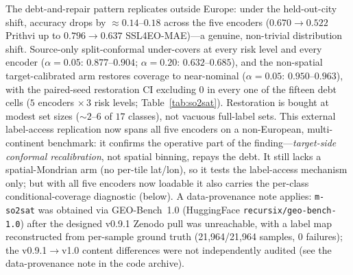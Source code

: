 \documentclass[journal]{IEEEtran}
\renewcommand{\_}{\textunderscore\allowbreak}
\begin{document}
The debt-and-repair pattern replicates outside Europe: under the held-out-city shift, accuracy
drops by ${\approx}0.14$--$0.18$ across the five encoders ($0.670\to0.522$ Prithvi up to $0.796\to0.637$
SSL4EO-MAE)---a genuine, non-trivial distribution shift.
Source-only split-conformal under-covers at every risk level and every encoder ($\alpha=0.05$: $0.877$--$0.904$;
$\alpha=0.20$: $0.632$--$0.685$), and the non-spatial target-calibrated arm restores coverage to
near-nominal ($\alpha=0.05$: $0.950$--$0.963$), with the paired-seed restoration CI
excluding $0$ in every one of the fifteen debt cells ($5$ encoders ${\times}\,3$ risk levels; Table~\ref{tab:so2sat}). Restoration is bought at modest set sizes
(${\sim}2$--$6$ of $17$ classes), not vacuous full-label sets. This external label-access
replication now spans all five encoders on a non-European, multi-continent benchmark: it confirms the operative part of the
finding---\emph{target-side conformal recalibration}, not spatial binning, repays the debt. It still lacks a
spatial-Mondrian arm (no per-tile lat/lon), so it tests the label-access mechanism only; but with all
five encoders now loadable it also carries the per-class conditional-coverage diagnostic (below). A data-provenance note applies: \texttt{m-so2sat} was
obtained via GEO-Bench~1.0 (HuggingFace \texttt{recursix/geo-bench-1.0}) after the designed v0.9.1 Zenodo
pull was unreachable, with a label map reconstructed from per-sample ground truth (21{,}964/21{,}964
samples, $0$ failures); the v0.9.1$\to$v1.0 content differences were not independently audited
(see the data-provenance note in the code archive).
\end{document}
